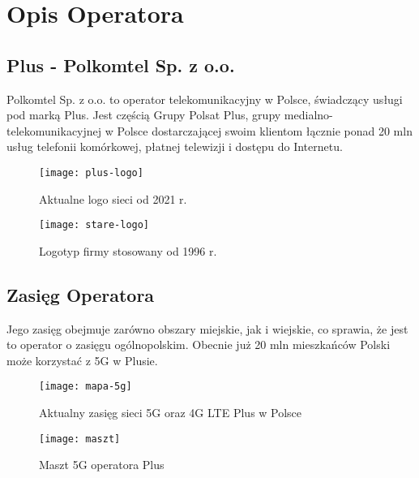 \section{Opis Operatora}

\subsection{Plus - Polkomtel Sp. z o.o.}

\begin{flushleft}

    Polkomtel Sp. z o.o. to operator telekomunikacyjny w Polsce, świadczący usługi pod marką Plus. Jest częścią Grupy Polsat Plus, grupy medialno-telekomunikacyjnej w Polsce dostarczającej swoim klientom łącznie ponad 20 mln usług telefonii komórkowej, płatnej telewizji i dostępu do Internetu.

    \begin{figure}[!htb]
        \centering
        \texttt{[image: plus-logo]}
        \caption{Aktualne logo sieci od 2021 r.}
    \end{figure}

    \begin{figure}[!htb]
        \centering
        \texttt{[image: stare-logo]}
        \caption{Logotyp firmy stosowany od 1996 r.}
    \end{figure}
        
\end{flushleft}


\subsection{Zasięg Operatora}
    \begin{flushleft}
        Jego zasięg obejmuje zarówno obszary miejskie, jak i wiejskie, co sprawia, że jest to operator o zasięgu ogólnopolskim. Obecnie już 20 mln mieszkańców Polski może korzystać z 5G w Plusie.

        \begin{figure}[!htb]
            \centering
            \texttt{[image: mapa-5g]}
            \caption{Aktualny zasięg sieci 5G oraz 4G LTE Plus w Polsce}
        \end{figure}
    
        \begin{figure}[!htb]
            \centering
            \texttt{[image: maszt]}
            \caption{Maszt 5G operatora Plus}
        \end{figure}

    \end{flushleft}
    
